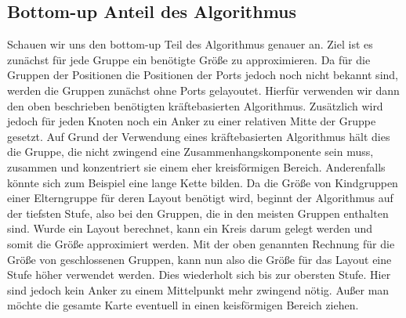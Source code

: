 \subsection{Bottom-up Anteil des Algorithmus}
Schauen wir uns den bottom-up Teil des Algorithmus genauer an. Ziel ist es zunächst für jede Gruppe ein benötigte Größe zu approximieren.
Da für die Gruppen der Positionen die Positionen der Ports jedoch noch nicht bekannt sind, werden die Gruppen zunächst ohne Ports gelayoutet.
Hierfür verwenden wir dann den oben beschrieben benötigten kräftebasierten Algorithmus. 
Zusätzlich wird jedoch für jeden Knoten noch ein Anker zu einer relativen Mitte der Gruppe gesetzt. 
Auf Grund der Verwendung eines kräftebasierten Algorithmus hält dies die Gruppe, die nicht zwingend eine Zusammenhangskomponente sein muss, zusammen 
und konzentriert sie einem eher kreisförmigen Bereich. Anderenfalls könnte sich zum Beispiel eine lange Kette bilden.
Da die Größe von Kindgruppen einer Elterngruppe für deren Layout benötigt wird, beginnt der Algorithmus auf der tiefsten Stufe,
also bei den Gruppen, die in den meisten Gruppen enthalten sind. Wurde ein Layout berechnet, kann ein Kreis darum gelegt werden und somit die Größe approximiert werden.
Mit der oben genannten Rechnung für die Größe von geschlossenen Gruppen, kann nun also die Größe für das Layout eine Stufe höher verwendet werden.
Dies wiederholt sich bis zur obersten Stufe. Hier sind jedoch kein Anker zu einem Mittelpunkt mehr zwingend nötig. 
Außer man möchte die gesamte Karte eventuell in einen keisförmigen Bereich ziehen.

